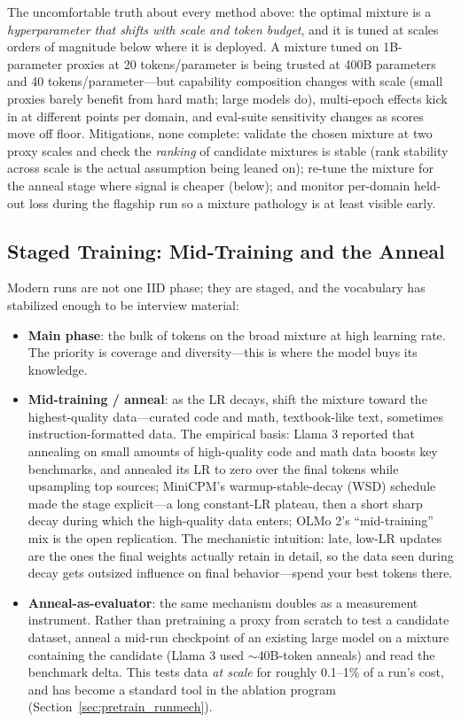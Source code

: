 The uncomfortable truth about every method above: the optimal mixture is a \textit{hyperparameter that shifts with scale and token budget}, and it is tuned at scales orders of magnitude below where it is deployed. A mixture tuned on 1B-parameter proxies at 20 tokens/parameter is being trusted at 400B parameters and 40 tokens/parameter---but capability composition changes with scale (small proxies barely benefit from hard math; large models do), multi-epoch effects kick in at different points per domain, and eval-suite sensitivity changes as scores move off floor. Mitigations, none complete: validate the chosen mixture at two proxy scales and check the \textit{ranking} of candidate mixtures is stable (rank stability across scale is the actual assumption being leaned on); re-tune the mixture for the anneal stage where signal is cheaper (below); and monitor per-domain held-out loss during the flagship run so a mixture pathology is at least visible early.

\subsection{Staged Training: Mid-Training and the Anneal}

Modern runs are not one IID phase; they are staged, and the vocabulary has stabilized enough to be interview material:

\begin{itemize}
    \item \textbf{Main phase}: the bulk of tokens on the broad mixture at high learning rate. The priority is coverage and diversity---this is where the model buys its knowledge.
    \item \textbf{Mid-training / anneal}: as the LR decays, shift the mixture toward the highest-quality data---curated code and math, textbook-like text, sometimes instruction-formatted data. The empirical basis: Llama 3 reported that annealing on small amounts of high-quality code and math data boosts key benchmarks, and annealed its LR to zero over the final tokens while upsampling top sources; MiniCPM's warmup-stable-decay (WSD) schedule made the stage explicit---a long constant-LR plateau, then a short sharp decay during which the high-quality data enters; OLMo 2's ``mid-training'' mix is the open replication. The mechanistic intuition: late, low-LR updates are the ones the final weights actually retain in detail, so the data seen during decay gets outsized influence on final behavior---spend your best tokens there.
    \item \textbf{Anneal-as-evaluator}: the same mechanism doubles as a measurement instrument. Rather than pretraining a proxy from scratch to test a candidate dataset, anneal a mid-run checkpoint of an existing large model on a mixture containing the candidate (Llama 3 used $\sim$40B-token anneals) and read the benchmark delta. This tests data \textit{at scale} for roughly 0.1--1\% of a run's cost, and has become a standard tool in the ablation program (Section~\ref{sec:pretrain_runmech}).
\end{itemize}

